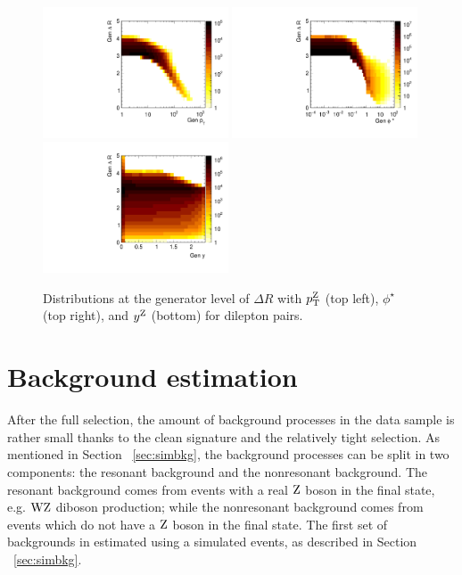 \begin{figure}
	\centering
	\includegraphics[width=0.49\textwidth]{figures/zpt/ptVdr.pdf}
	\includegraphics[width=0.49\textwidth]{figures/zpt/phiVdr.pdf}
	\includegraphics[width=0.49\textwidth]{figures/zpt/rapVdr.pdf}
	\caption{Distributions at the generator level of $\Delta R$ with $p_{\mathrm{T}}^{\mathrm{Z}}$ (top left), $\phi^\star$ (top right), and $y^{\mathrm{Z}}$ (bottom) for dilepton pairs.}
	\label{fig:gendist4}
\end{figure}

\section{Background estimation}
After the full selection, the amount of background processes in the data sample is 
rather small thanks to the clean signature and the relatively tight selection. 
As mentioned in Section ~\ref{sec:simbkg}, the background processes can be split in 
two components: the resonant background and the nonresonant background. 
The resonant background comes from events with a real $\mathrm{Z}$ boson in the final state, 
e.g. $\mathrm{W}\mathrm{Z}$ diboson production; while the nonresonant background comes from events 
which do not have a $\mathrm{Z}$ boson in the final state. 
The first set of backgrounds in estimated using a simulated events, as described in 
Section ~\ref{sec:simbkg}. 

